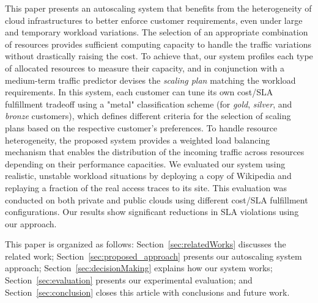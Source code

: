 This paper presents an autoscaling system that benefits from the
heterogeneity of cloud infrastructures to better enforce customer
requirements, even under large and temporary workload variations. The
selection of an appropriate combination of resources provides sufficient
computing capacity to handle the traffic variations without
drastically raising the cost. To achieve that, our system profiles
each type of allocated resources to measure their capacity, and in
conjunction with a medium-term traffic predictor devises
the \emph{scaling plan} matching the workload
requirements. In this system, each customer can tune its own cost/SLA
fulfillment tradeoff using a "metal" classification scheme (for {\em gold}, {\em silver}, 
and {\em bronze} customers), which
defines different criteria for the selection of scaling plans
based on the respective customer's preferences. To handle resource heterogeneity,
the proposed system provides a weighted load balancing mechanism that
enables the distribution of the incoming traffic across resources depending
on their performance capacities. We evaluated our system using realistic,
unstable workload situations by deploying a copy of Wikipedia and
replaying a fraction of the real access traces to its 
site. This evaluation was conducted on both private and public clouds
using different cost/SLA fulfillment configurations. Our results show significant
reductions in SLA violations using our approach.

This paper is organized as follows: Section~\ref{sec:relatedWorks} discusses
the related work; Section~\ref{sec:proposed_approach} presents our
autoscaling system approach; Section~\ref{sec:decisionMaking} explains
how our system works; Section~\ref{sec:evaluation} presents
our experimental evaluation; and Section~\ref{sec:conclusion} closes this article with conclusions and future work.

